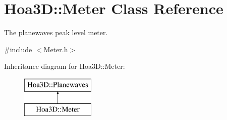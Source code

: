 \hypertarget{class_hoa3_d_1_1_meter}{\section{Hoa3\-D\-:\-:Meter Class Reference}
\label{class_hoa3_d_1_1_meter}
}


The planewaves peak level meter.  




{\ttfamily \#include $<$Meter.\-h$>$}

Inheritance diagram for Hoa3\-D\-:\-:Meter\-:\begin{figure}[H]
\begin{center}
\leavevmode
\includegraphics[height=2.000000cm]{class_hoa3_d_1_1_meter}
\end{center}
\end{figure}

